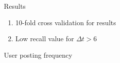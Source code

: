 \documentclass[compress]{beamer}
\begin{document}
\begin{frame}{Results}

\begin{table}
	\label{table:naivebayesresults}
	\caption{Naive Bayes classification results}
\end{table}
\begin{enumerate}
	\item 10-fold cross validation for results
	\item Low recall value for $\Delta t > 6$
\end{enumerate}
\end{frame}
\begin{frame}{User posting frequency}
\begin{figure}\label{sleepcycle}
\end{figure}
\end{frame}


\end{document}
